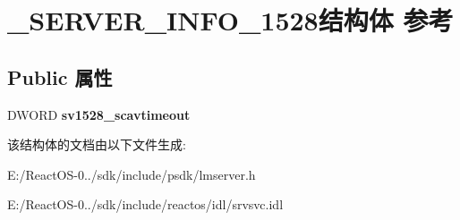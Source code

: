 \hypertarget{struct___s_e_r_v_e_r___i_n_f_o__1528}{}\section{\+\_\+\+S\+E\+R\+V\+E\+R\+\_\+\+I\+N\+F\+O\+\_\+1528结构体 参考}
\label{struct___s_e_r_v_e_r___i_n_f_o__1528}
\subsection*{Public 属性}
\begin{DoxyCompactItemize}
\item 
\mbox{\label{struct___s_e_r_v_e_r___i_n_f_o__1528_a5a0c55f5c312e95879aa1cedc92e158c}} 
D\+W\+O\+RD {\bfseries sv1528\+\_\+scavtimeout}
\end{DoxyCompactItemize}


该结构体的文档由以下文件生成\+:\begin{DoxyCompactItemize}
\item 
E\+:/\+React\+O\+S-\/0../sdk/include/psdk/lmserver.\+h\item 
E\+:/\+React\+O\+S-\/0../sdk/include/reactos/idl/srvsvc.\+idl\end{DoxyCompactItemize}
